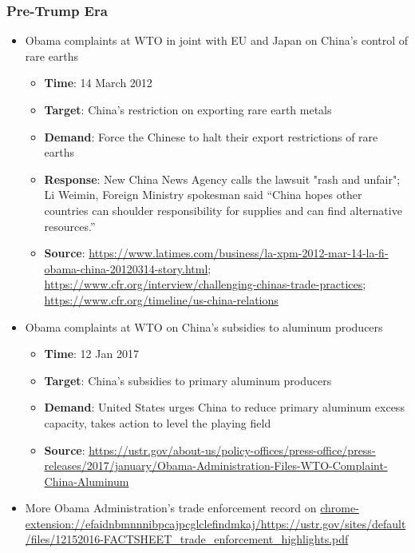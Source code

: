 		\subsubsection{Pre-Trump Era}
			\begin{itemize}
			\item	Obama complaints at WTO in joint with EU and Japan on China's control of rare earths
				\begin{itemize}
				\item	\textbf{Time}: 14 March 2012
				\item \textbf{Target}: China's restriction on exporting rare earth metals
				\item \textbf{Demand}: Force the Chinese to halt their export restrictions of rare earths
				\item \textbf{Response}: New China News Agency calls the lawsuit "rash and unfair"; Li Weimin, Foreign Ministry spokesman said  “China hopes other countries can shoulder responsibility for supplies and can find alternative resources.”
				\item \textbf{Source}: \url{https://www.latimes.com/business/la-xpm-2012-mar-14-la-fi-obama-china-20120314-story.html}; \url{https://www.cfr.org/interview/challenging-chinas-trade-practices}; \url{https://www.cfr.org/timeline/us-china-relations}
				\end{itemize}
			\item Obama complaints at WTO on China's subsidies to aluminum producers
				\begin{itemize}
				\item	\textbf{Time}: 12 Jan 2017
				\item \textbf{Target}: China's subsidies to primary aluminum producers
				\item \textbf{Demand}: United States urges China to reduce primary aluminum excess capacity, takes action to level the playing field
				\item \textbf{Source}: \url{https://ustr.gov/about-us/policy-offices/press-office/press-releases/2017/january/Obama-Administration-Files-WTO-Complaint-China-Aluminum}
				\end{itemize}
			\item More Obama Administration's trade enforcement record on \url{chrome-extension://efaidnbmnnnibpcajpcglclefindmkaj/https://ustr.gov/sites/default/files/12152016-FACTSHEET_trade_enforcement_highlights.pdf}
			\end{itemize}
		
